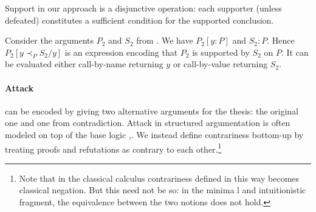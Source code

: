 \documentclass{IOS-Book-Article}
\begin{document}
Support in our approach is a disjunctive operation: each supporter (unless defeated) constitutes a sufficient condition for the supported conclusion.

\begin{example}[Support]
  Consider the arguments $P_2$ and $S_2$ from . We have $P_2[y:P]$ and $S_2:P$. Hence $P_2[y \prec_P S_2/y]$ is an expression encoding that $P_2$ is supported by $S_2$ on $P$. It can be evaluated either call-by-name returning $y$ or call-by-value returning $S_2$.
\end{example}

\paragraph{Attack} can be encoded by giving two alternative arguments for the thesis: the original one and one from contradiction.
Attack in structured argumentation is often modeled on top of the base logic \cite{BondarenkoDungKowalskiToni1997DefaultReasoning},\cite{ArieliStrasser2015SequentBasedLogicalArgumentation}.
We instead define contrariness bottom-up by treating proofs and refutations as contrary to each other.\footnote{Note that in the classical calculus contrariness defined in this way becomes classical negation. But this need not be so: in the minima
  l and intuitionistic fragment, the equivalence between the two notions does not hold.}
\end{document}
